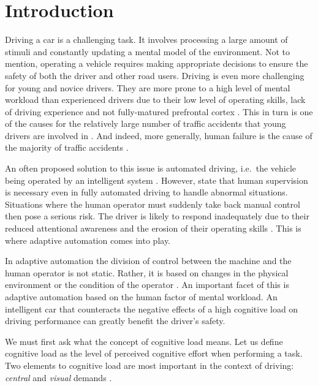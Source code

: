 
\section{Introduction}\label{sec:introduction}

Driving a car is a challenging task. 
It involves processing a large amount of stimuli and constantly updating a mental model of the environment.
Not to mention, operating a vehicle requires making appropriate decisions to ensure the safety of both the driver and other road users.
Driving is even more challenging for young and novice drivers. 
They are more prone to a high level of mental workload than experienced drivers due to their low level of operating skills, lack of driving experience \citep{Gregersen1996} and not fully-matured prefrontal cortex \citep{Ross2014}.
This in turn is one of the causes for the relatively large number of traffic accidents that young drivers are involved in \citep{Sena2013}.
And indeed, more generally, human failure is the cause of the majority of traffic accidents \citep{DeWaard1996}.

An often proposed solution to this issue is automated driving, i.e.\ the vehicle being operated by an intelligent system \citep{Cabrall2018}.
However, \citet{Brookhuis2007} state that human supervision is necessary even in fully automated driving to handle abnormal situations.
Situations where the human operator must suddenly take back manual control then pose a serious risk.
The driver is likely to respond inadequately due to their reduced attentional awareness and the erosion of their operating skills \citep{Dijksterhuis2012}.
This is where adaptive automation comes into play.

In adaptive automation the division of control between the machine and the human operator is not static.
Rather, it is based on changes in the physical environment or the condition of the operator \citep{Sheridan2011}.
An important facet of this is adaptive automation based on the human factor of mental workload.
An intelligent car that counteracts the negative effects of a high cognitive load on driving performance can greatly benefit the driver's safety.

We must first ask what the concept of cognitive load means.
Let us define cognitive load as the level of perceived cognitive effort when performing a task.
Two elements to cognitive load are most important in the context of driving: \textit{central} and \textit{visual} demands \citep{DeWaard1996}. 

